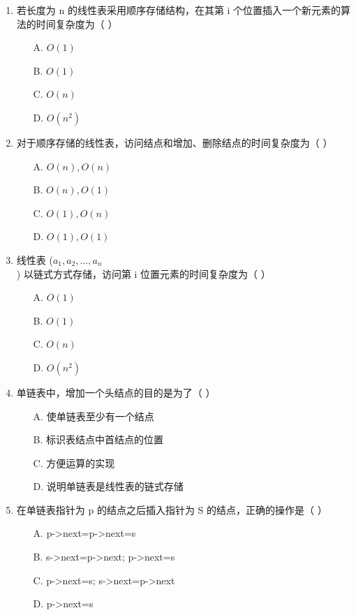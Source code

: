 \documentclass[12pt, a4paper]{article}
\begin{document}
\begin{enumerate}[label=\arabic*.]
	\item 若长度为 n 的线性表采用顺序存储结构，在其第 i 个位置插入一个新元素的算法的时间复杂度为（ ）
	      \begin{enumerate}
		      \item[A.] $O(1)$
		      \item[B.] $O(1)$
		      \item[C.] $O(n)$
		      \item[D.] $O(n^2)$
	      \end{enumerate}

	\item 对于顺序存储的线性表，访问结点和增加、删除结点的时间复杂度为（ ）
	      \begin{enumerate}
		      \item[A.] $O(n), O(n)$
		      \item[B.] $O(n), O(1)$
		      \item[C.] $O(1), O(n)$
		      \item[D.] $O(1), O(1)$
	      \end{enumerate}

	\item 线性表 ($a_1, a_2, \dots, a_n$) 以链式方式存储，访问第 i 位置元素的时间复杂度为（ ）
	      \begin{enumerate}
		      \item[A.] $O(1)$
		      \item[B.] $O(1)$
		      \item[C.] $O(n)$
		      \item[D.] $O(n^2)$
	      \end{enumerate}

	\item 单链表中，增加一个头结点的目的是为了（ ）
	      \begin{enumerate}
		      \item[A.] 使单链表至少有一个结点
		      \item[B.] 标识表结点中首结点的位置
		      \item[C.] 方便运算的实现
		      \item[D.] 说明单链表是线性表的链式存储
	      \end{enumerate}

	\item 在单链表指针为 p 的结点之后插入指针为 S 的结点，正确的操作是（ ）
	      \begin{enumerate}
		      \item[A.] p->next=p->next=s
		      \item[B.] s->next=p->next; p->next=s
		      \item[C.] p->next=s; s->next=p->next
		      \item[D.] p->next=s
	      \end{enumerate}


\end{enumerate}
\end{document}
